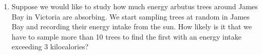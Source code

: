 \documentclass[11pt]{article}
\begin{document}
\begin{enumerate}[label=\textbf{Question \arabic*:},start=1]
\begin{enumerate}
  \item Suppose we would like to study how much energy arbutus trees around James Bay in Victoria are absorbing. We start sampling trees at random in James Bay and recording their energy intake from the sun. How likely is it that we have to sample more than 10 trees to find the first with an energy intake exceeding 3 kilocalories?


\end{enumerate}

\end{enumerate}
\end{document}
